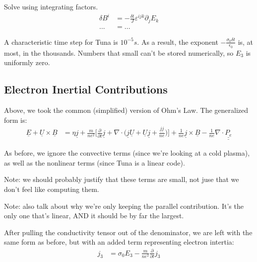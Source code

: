 Solve using integrating factors. 
\begin{align}
  \delta B^i & = -\frac{\delta t}{J} \varepsilon^{ijk} \partial_j E_k \\
  ... & = ...
\end{align}

A characteristic time step for Tuna is $10^{-5} s$. As a result, the exponent $- \frac{\sigma_0 \delta t}{\epsilon_0}$ is, at most, in the thousands. Numbers that small can't be stored numerically, so $E_3$ is uniformly zero. 

\subsection{Electron Inertial Contributions}

Above, we took the common (simplified) version of Ohm's Law. The generalized form is:
\begin{align}
  \underline{E} +
  \underline{U} \times \underline{B} & = 
  \eta \underline{j} +
  \frac{m}{n e^2} \Big[
    \frac{\partial}{\partial t} \underline{j} +
    \nabla \cdot \big( \underline{j} \underline{U} +
    \underline{U} \underline{j} +
    \frac{ \underline{j} \underline{j} }{n e} \big) 
  \Big] +
  \frac{1}{n e} \underline{j} \times \underline{B} -
  \frac{1}{n e} \nabla \cdot \underline{ \underline{P_e} }
\end{align}

As before, we ignore the convective terms (since we're looking at a cold plasma), as well as the nonlinear terms (since Tuna is a linear code). 

Note: we should probably justify that these terms are small, not juse that we don't feel like computing them. 

Note: also talk about why we're only keeping the parallel contribution. It's the only one that's linear, AND it should be by far the largest. 

After pulling the conductivity tensor out of the denominator, we are left with the same form as before, but with an added term representing electron intertia:
\begin{align}
  j_3 & =
  \sigma_0 E_3 -
  \frac{m}{n e^2} \frac{\partial}{\partial t} j_3
\end{align}

